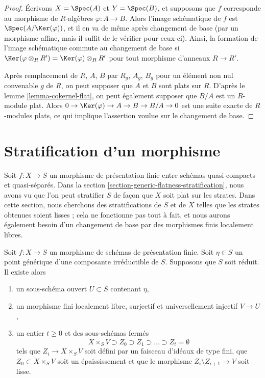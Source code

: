 \begin{proof}
\medskip\noindent
Écrivons $X = \Spec(A)$ et $Y = \Spec(B)$, et supposons que $f$ corresponde
au morphisme de $R$-algèbres $\varphi : A \to B$.
Alors l'image schématique de $f$ est $\Spec(A/\Ker(\varphi))$,
et il en va de même après changement de base (par un morphisme affine, mais il
suffit de le vérifier pour ceux-ci).
Ainsi, la formation de l'image schématique commute
au changement de base si $\Ker(\varphi \otimes_R R') = \Ker(\varphi) \otimes_R R'$
pour tout morphisme d'anneaux $R \to R'$.

\medskip\noindent
Après remplacement de $R$, $A$, $B$ par $R_g$, $A_g$, $B_g$ pour un
élément non nul convenable $g$ de $R$, on peut supposer que $A$ et $B$ sont plats sur $R$.
D'après le lemme \ref{lemma-cokernel-flat},
on peut également supposer que $B/A$ est un $R$-module plat.
Alors $0 \to \Ker(\varphi) \to A \to B \to B/A \to 0$
est une suite exacte de $R$-modules plats, ce qui implique
l'assertion voulue sur le changement de base.
\end{proof}






\section{Stratification d'un morphisme}
\label{section-stratifying-morphisms}

\noindent
Soit $f : X \to S$ un morphisme de présentation finie entre schémas quasi-compacts
et quasi-séparés.
Dans la section \ref{section-generic-flatness-stratification},
nous avons vu que l'on peut stratifier $S$ de façon que $X$ soit plat
sur les strates. Dans cette section, nous cherchons des stratifications de $S$
et de $X$ telles que les strates obtenues soient lisses ; cela ne fonctionne pas tout à fait,
et nous aurons également besoin d'un changement de base par des morphismes finis localement libres.

\begin{lemma}
\label{lemma-smoothness-stratification-at-generic-point}
Soit $f : X \to S$ un morphisme de schémas de présentation finie.
Soit $\eta \in S$ un point générique d'une composante irréductible de $S$.
Supposons que $S$ soit réduit. Il existe alors
\begin{enumerate}
\item un sous-schéma ouvert $U \subset S$ contenant $\eta$,
\item un morphisme fini localement libre, surjectif et universellement injectif
$V \to U$,
\item un entier $t \geq 0$ et des sous-schémas fermés
$$
X \times_S V \supset Z_0 \supset Z_1 \supset \ldots \supset Z_t = \emptyset
$$
tels que $Z_i \to X \times_S V$ soit défini par un faisceau d'idéaux de type fini,
que $Z_0 \subset X \times_S V$ soit un épaississement et que le morphisme
$Z_i \setminus Z_{i + 1} \to V$ soit lisse.
\end{enumerate}
\end{lemma}


